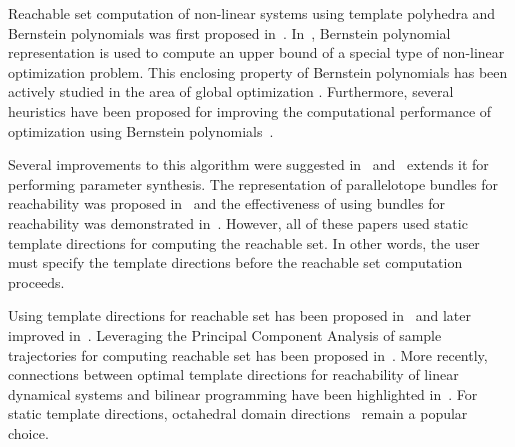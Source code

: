 Reachable set computation of non-linear systems using template polyhedra and Bernstein polynomials was first proposed in~\cite{dang2009image}.
%
In~\cite{dang2009image}, Bernstein polynomial representation is used to compute an upper bound of a special type of non-linear optimization problem.
%
This enclosing property of Bernstein polynomials has been actively studied in the area of global optimization \cite{nataray2002algorithm, garloff2003bernstein, nataraj2007new}.
%
Furthermore, several heuristics have been proposed for improving the computational performance of optimization using Bernstein polynomials~\cite{smith2009fast,munoz2013formalization}.

Several improvements to this algorithm were suggested in~\cite{dang2012reachability, sassi2012reachability} and~\cite{dang2014parameter} extends it for performing parameter synthesis.
The representation of parallelotope bundles for reachability was proposed in~\cite{dreossi2016parallelotope} and the effectiveness of using bundles for reachability was demonstrated in~\cite{dreossi2017sapo, dreossi2017reachability}.
%
However, all of these papers used static template directions for computing the reachable set.
%
In other words, the user must specify the template directions before the reachable set computation proceeds.

Using template directions for reachable set has been proposed in~\cite{sankaranarayanan2008symbolic} and later improved in~\cite{dang2011template}.
%
Leveraging the Principal Component Analysis of sample trajectories for computing reachable set has been proposed in~\cite{stursberg2003efficient,chen2011choice,seladji2017finding}.
%
More recently, connections between optimal template directions for reachability of linear dynamical systems and bilinear programming have been highlighted in~\cite{gronski2019template}.
%
For static template directions, octahedral domain directions~\cite{clariso2004octahedron} remain a popular choice.
